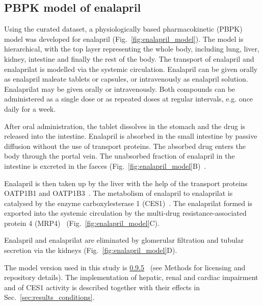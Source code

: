 \documentclass[pharmaceutics,article,submit,pdftex,moreauthors]{Definitions/mdpi}
\begin{document}
\subsection{PBPK model of enalapril}
\label{sec:results_model}
Using the curated dataset, a physiologically based pharmacokinetic (PBPK) model was developed for enalapril (Fig.~\ref{fig:enalapril_model}). The model is hierarchical, with the top layer representing the whole body, including lung, liver, kidney, intestine and finally the rest of the body. The transport of enalapril and enalaprilat is modelled via the systemic circulation. Enalapril can be given orally as enalapril maleate tablets or capsules, or intravenously as enalapril solution. Enalaprilat may be given orally or intravenously. Both compounds can be administered as a single dose or as repeated doses at regular intervals, e.g. once daily for a week. 

After oral administration, the tablet dissolves in the stomach and the drug is released into the intestine. Enalapril is absorbed in the small intestine by passive diffusion without the use of transport proteins. The absorbed drug enters the body through the portal vein. The unabsorbed fraction of enalapril in the intestine is excreted in the faeces (Fig.~\ref{fig:enalapril_model}B)~\cite{Knutter2008, Smeets2020a, Smeets2020}.

Enalapril is then taken up by the liver with the help of the transport proteins OATP1B1 and OATP1B3~\cite{Liu2006a}. The metabolism of enalapril to enalaprilat is catalysed by the enzyme carboxylesterase 1 (CES1)~\cite{Thomsen2014}. The enalaprilat formed is exported into the systemic circulation by the multi-drug resistance-associated protein 4 (MRP4)~\cite{Ferslew2014} (Fig.~\ref{fig:enalapril_model}C). 

Enalapril and enalaprilat are eliminated by glomerular filtration and tubular secretion via the kidneys (Fig.~\ref{fig:enalapril_model}D).

The model version used in this study is \href{https://zenodo.org/doi/10.5281/zenodo.11067564}{0.9.5}~\cite{enalapril-model-v0.9.5} (see Methods for licensing and repository details). The implementation of hepatic, renal and cardiac impairment and of CES1 activity is described together with their effects in Sec.~\ref{sec:results_conditions}.
\end{document}
